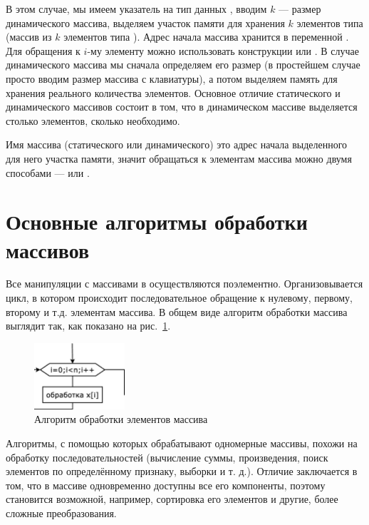 В этом случае, мы имеем указатель на тип данных , вводим $k$ --- размер динамического массива, выделяем
участок памяти для хранения $k$ элементов типа  (массив из
$k$  элементов типа ). Адрес начала массива хранится в переменной
. Для обращения к $i$-му элементу можно использовать конструкции  или
. В случае динамического массива мы сначала определяем его размер (в простейшем случае просто
вводим размер массива с клавиатуры), а потом выделяем память для хранения реального количества элементов. 
Основное отличие статического и динамического массивов состоит в том, что в динамическом массиве выделяется столько
элементов, сколько необходимо.

Имя массива (статического или динамического) это адрес начала выделенного для него участка памяти, значит обращаться к элементам массива можно двумя способами ---  или .



\section[Основные алгоритмы обработки массивов]{Основные алгоритмы обработки массивов}
Все манипуляции с массивами в  осуществляются поэлементно. Организовывается цикл, в котором происходит
последовательное обращение к нулевому, первому, второму и т.д. элементам массива. В общем виде алгоритм обработки
массива выглядит так, как показано на рис.~\ref{ch05:refDrawing0}.

\begin{figure}[htb]
\begin{center}
\includegraphics[width=0.3\textwidth]{img/ris_5_1}
\caption{Алгоритм обработки элементов массива}
\label{ch05:refDrawing0}
\end{center}
\end{figure}

Алгоритмы, с помощью которых обрабатывают одномерные массивы, похожи на обработку последовательностей (вычисление суммы,
произведения, поиск элементов по определённому признаку, выборки и т. д.). Отличие заключается в том, что в массиве
одновременно доступны все его компоненты, поэтому становится возможной, например, сортировка его элементов и другие,
более сложные преобразования.

